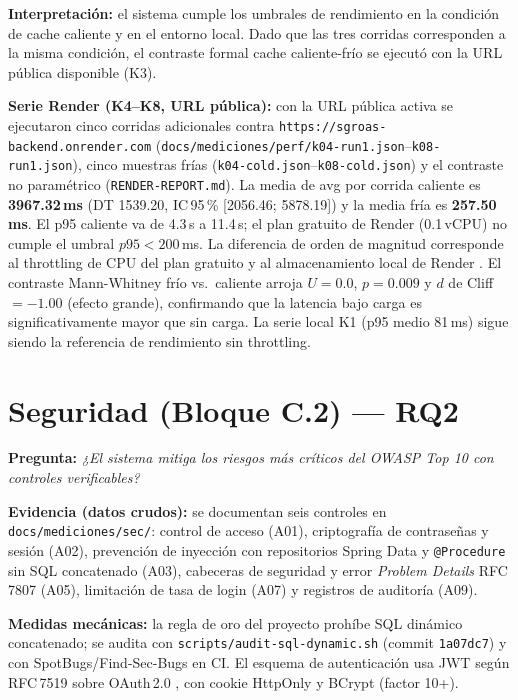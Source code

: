 \textbf{Interpretación:} el sistema cumple los umbrales de rendimiento en la
condición de cache caliente y en el entorno local. Dado que las tres corridas
corresponden a la misma condición, el contraste formal cache caliente-frío se
ejecutó con la URL pública disponible (K3).

\textbf{Serie Render (K4--K8, URL pública):} con la URL pública activa se ejecutaron
cinco corridas adicionales contra \texttt{https://sgroas-backend.onrender.com}
(\texttt{docs/mediciones/perf/k04-run1.json}--\texttt{k08-run1.json}), cinco muestras
frías (\texttt{k04-cold.json}--\texttt{k08-cold.json}) y el contraste no paramétrico
(\texttt{RENDER-REPORT.md}). La media de avg por corrida caliente es
\textbf{3967.32\,ms} (DT 1539.20, IC\,95\,\% [2056.46; 5878.19]) y la media fría es
\textbf{257.50\,ms}. El p95 caliente va de 4.3\,s a 11.4\,s; el plan gratuito de
Render (0.1\,vCPU) no cumple el umbral $p95 < 200$\,ms. La diferencia de orden de
magnitud corresponde al throttling de CPU del plan gratuito y al almacenamiento
local de Render \cite{jiang2015}. El contraste Mann-Whitney frío vs.\ caliente
arroja $U = 0.0$, $p = 0.009$ y $d$ de Cliff $= -1.00$ (efecto grande), confirmando
que la latencia bajo carga es significativamente mayor que sin carga. La serie
local K1 (p95 medio 81\,ms) sigue siendo la referencia de rendimiento sin
throttling.

\section{Seguridad (Bloque C.2) — RQ2}
\label{sec:sec}

\textbf{Pregunta:} \emph{¿El sistema mitiga los riesgos más críticos del OWASP Top
10 \cite{owasp2021} con controles verificables?}

\textbf{Evidencia (datos crudos):} se documentan seis controles en
\texttt{docs/mediciones/sec/}: control de acceso (A01), criptografía de contraseñas
y sesión (A02), prevención de inyección con repositorios Spring Data y
\texttt{@Procedure} sin SQL concatenado (A03), cabeceras de seguridad y error
\emph{Problem Details} RFC\,7807 \cite{rfc7807} (A05), limitación de tasa de login
(A07) y registros de auditoría (A09).

\textbf{Medidas mecánicas:} la regla de oro del proyecto prohíbe SQL dinámico
concatenado; se audita con \texttt{scripts/audit-sql-dynamic.sh} (commit
\texttt{1a07dc7}) y con SpotBugs/Find-Sec-Bugs en CI. El esquema de autenticación
usa JWT según RFC\,7519 \cite{rfc7519} sobre OAuth\,2.0 \cite{rfc6749}, con cookie
HttpOnly y BCrypt (factor 10+).


